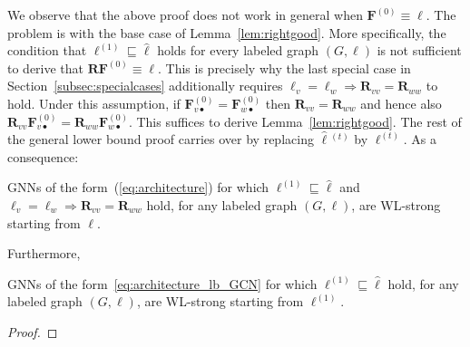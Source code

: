 We observe that the above proof does not work in general when $\mathbf{F}^{(0)}\equiv\pmb{\ell}$. The problem is with the base case of Lemma~\ref{lem:rightgood}. More specifically, the condition that $\pmb{\ell}^{(1)}\sqsubseteq \hat{\pmb{\ell}}$ holds for every labeled graph $(G,\pmb{\ell})$ is not sufficient to derive that $\mathbf{R}\mathbf{F}^{(0)}\equiv\pmb{\ell}$. This is precisely why the last special case in  Section~\ref{subsec:specialcases} additionally requires $\pmb{\ell}_v=\pmb{\ell}_w\Rightarrow \mathbf{R}_{vv}=\mathbf{R}_{ww}$ to hold.
Under this assumption, if $\mathbf{F}^{(0)}_{v\bullet}=\mathbf{F}^{(0)}_{w\bullet}$
then $\mathbf{R}_{vv}=\mathbf{R}_{ww}$ and hence also 
$\mathbf{R}_{vv}\mathbf{F}^{(0)}_{v\bullet}=\mathbf{R}_{ww}\mathbf{F}^{(0)}_{w\bullet}$.
This suffices to derive Lemma~\ref{lem:rightgood}. The rest of the general lower bound proof
carries over by replacing $\hat{\pmb{\ell}}{}^{(t)}$ by $\pmb{\ell}^{(t)}$. As a consequence:
\begin{corollary}
GNNs of the form~(\ref{eq:architecture}) for which 
$\pmb{\ell}^{(1)}\sqsubseteq\hat{\pmb{\ell}}$ and $\pmb{\ell}_v=\pmb{\ell}_w\Rightarrow \mathbf{R}_{vv}=\mathbf{R}_{ww}$ hold, for any labeled graph $(G,\pmb{\ell})$, are WL-strong starting from $\pmb{\ell}$.
\end{corollary}

Furthermore, 
\begin{corollary}
GNNs of the form~\ref{eq:architecture_lb_GCN} for which 
$\pmb{\ell}^{(1)}\sqsubseteq\hat{\pmb{\ell}}$  hold, for any labeled graph $(G,\pmb{\ell})$, are WL-strong starting from $\pmb{\ell}^{(1)}$.
\end{corollary}
\begin{proof}
\end{proof}


